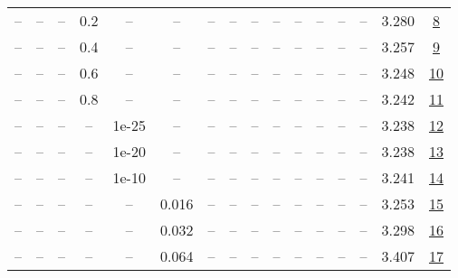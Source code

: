 \begin{table}[H]
\begin{tabular}{cccccccccccccccc}
-- & -- & -- & 0.2 & -- & -- & -- & -- & -- & -- & -- & -- & -- & -- & 3.280 & \href{https://wandb.ai/stanford-mercury/optimizer-scaling/runs/sweep-130m-21B-muon4353c9lr0.008-wd0.1-minlr0-warmup0-b10.8-b20.-66d626}{8} \\
-- & -- & -- & 0.4 & -- & -- & -- & -- & -- & -- & -- & -- & -- & -- & 3.257 & \href{https://wandb.ai/stanford-mercury/optimizer-scaling/runs/sweep-130m-21B-muon019394lr0.008-wd0.1-minlr0-warmup0-b10.8-b20.-d9267d}{9} \\
-- & -- & -- & 0.6 & -- & -- & -- & -- & -- & -- & -- & -- & -- & -- & 3.248 & \href{https://wandb.ai/stanford-mercury/optimizer-scaling/runs/sweep-130m-21B-muonc5c7a2lr0.008-wd0.1-minlr0-warmup0-b10.8-b20.-285fdb}{10} \\
-- & -- & -- & 0.8 & -- & -- & -- & -- & -- & -- & -- & -- & -- & -- & 3.242 & \href{https://wandb.ai/stanford-mercury/optimizer-scaling/runs/sweep-130m-21B-muon740327lr0.008-wd0.1-minlr0-warmup0-b10.8-b20.-5585f4}{11} \\
-- & -- & -- & -- & 1e-25 & -- & -- & -- & -- & -- & -- & -- & -- & -- & 3.238 & \href{https://wandb.ai/stanford-mercury/optimizer-scaling/runs/sweep-130m-21B-muon438751lr0.008-wd0.1-minlr0-warmup0-b10.8-b20.-d942b8}{12} \\
-- & -- & -- & -- & 1e-20 & -- & -- & -- & -- & -- & -- & -- & -- & -- & 3.238 & \href{https://wandb.ai/stanford-mercury/optimizer-scaling/runs/sweep-130m-21B-muonadb698lr0.008-wd0.1-minlr0-warmup0-b10.8-b20.-d2374c}{13} \\
-- & -- & -- & -- & 1e-10 & -- & -- & -- & -- & -- & -- & -- & -- & -- & 3.241 & \href{https://wandb.ai/stanford-mercury/optimizer-scaling/runs/sweep-130m-21B-muoned85fdlr0.008-wd0.1-minlr0-warmup0-b10.8-b20.-c84b6d}{14} \\
-- & -- & -- & -- & -- & 0.016 & -- & -- & -- & -- & -- & -- & -- & -- & 3.253 & \href{https://wandb.ai/stanford-mercury/optimizer-scaling/runs/sweep-130m-21B-muon106105lr0.016-wd0.1-minlr0-warmup0-b10.8-b20.-145c38}{15} \\
-- & -- & -- & -- & -- & 0.032 & -- & -- & -- & -- & -- & -- & -- & -- & 3.298 & \href{https://wandb.ai/stanford-mercury/optimizer-scaling/runs/sweep-130m-21B-muon8561f0lr0.032-wd0.1-minlr0-warmup0-b10.8-b20.-2b4c80}{16} \\
-- & -- & -- & -- & -- & 0.064 & -- & -- & -- & -- & -- & -- & -- & -- & 3.407 & \href{https://wandb.ai/stanford-mercury/optimizer-scaling/runs/sweep-130m-21B-muonc0fdedlr0.064-wd0.1-minlr0-warmup0-b10.8-b20.-de3c13}{17} \\

\end{tabular}
\end{table}
